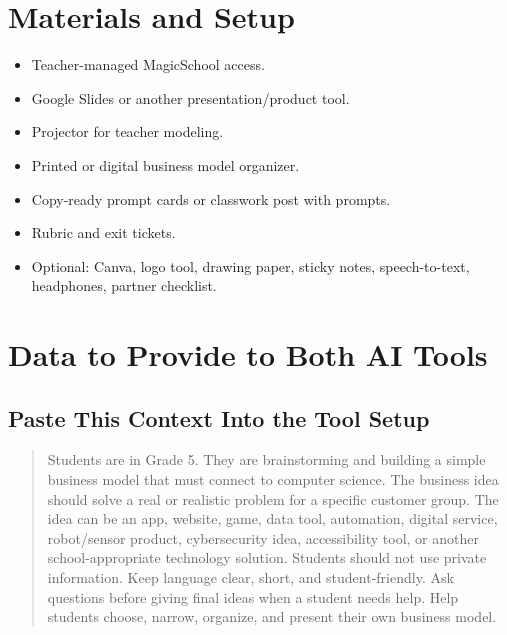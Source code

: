 \documentclass[11pt]{article}
\begin{document}
\section{Materials and Setup}
\begin{itemize}
  \item Teacher-managed MagicSchool access.
  \item Google Slides or another presentation/product tool.
  \item Projector for teacher modeling.
  \item Printed or digital business model organizer.
  \item Copy-ready prompt cards or classwork post with prompts.
  \item Rubric and exit tickets.
  \item Optional: Canva, logo tool, drawing paper, sticky notes, speech-to-text, headphones, partner checklist.
\end{itemize}

\section{Data to Provide to Both AI Tools}
\subsection{Paste This Context Into the Tool Setup}
\begin{quote}
Students are in Grade 5. They are brainstorming and building a simple business model that must connect to computer science. The business idea should solve a real or realistic problem for a specific customer group. The idea can be an app, website, game, data tool, automation, digital service, robot/sensor product, cybersecurity idea, accessibility tool, or another school-appropriate technology solution. Students should not use private information. Keep language clear, short, and student-friendly. Ask questions before giving final ideas when a student needs help. Help students choose, narrow, organize, and present their own business model.
\end{quote}
\end{document}
